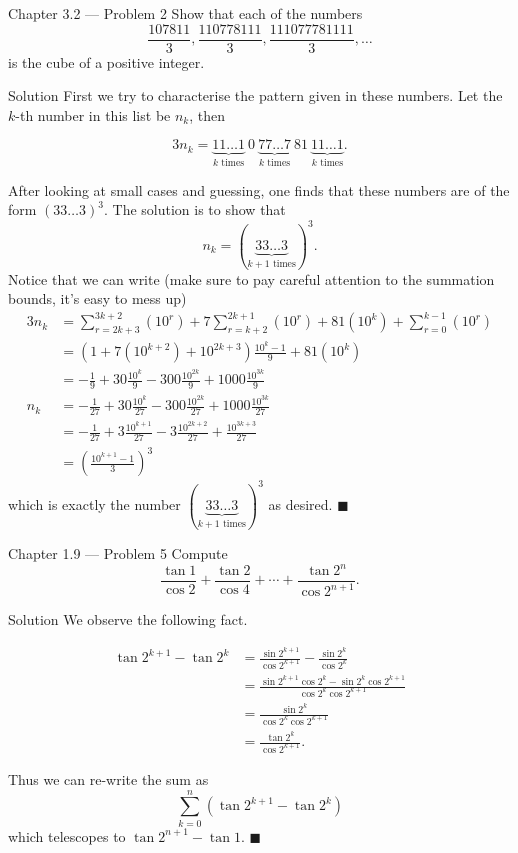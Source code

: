 \documentclass{article}
\begin{document}
\begin{problem}{Chapter 3.2 --- Problem 2}
Show that each of the numbers
$$
\frac{107811}{3}, \frac{110778111}{3}, \frac{111077781111}{3}, \ldots
$$
is the cube of a positive integer.
\end{problem}

\begin{solution}{Solution}
First we try to characterise the pattern given in these numbers. Let the
$k$-th number in this list be $n_k$, then

$$
3n_k = \underbrace{11\ldots1}_{k \text{ times}}\ 0 \
       \underbrace{77\ldots7}_{k \text{ times}}\ 81 \
       \underbrace{11\ldots1}_{k \text{ times}}.
$$

After looking at small cases and guessing, one finds that these numbers
are of the form $(33\ldots3)^3$. The solution is to show that
$$
n_k = (\underbrace{33\ldots3}_{k+1 \text{ times}})^3.
$$
Notice that we can write (make sure to pay careful attention
to the summation bounds, it's easy to mess up)
\[
\begin{aligned}
3n_k &= \sum_{r = 2k+3}^{3k+2} (10^r) + 7\sum_{r = k+2}^{2k+1} (10^r) +
81(10^{k}) + \sum_{r = 0}^{k-1} (10^r)\\
&= \left( 1 + 7(10^{k+2}) + 10^{2k+3} \right) \frac{10^k - 1}{9} + 81(10^k)
\\
&= -\frac19 + 30\frac{10^k}{9} - 300\frac{10^{2k}}{9} + 1000\frac{10^{3k}}{9}\\
n_k &= -\frac{1}{27} + 30\frac{10^k}{27} - 300\frac{10^{2k}}{27} +
1000\frac{10^{3k}}{27}\\
&= -\frac{1}{27} + 3\frac{10^{k+1}}{27} - 3\frac{10^{2k+2}}{27} +
\frac{10^{3k+3}}{27} \\
&= \left(\frac{10^{k+1} - 1}{3}\right)^3
\end{aligned}
\]
which is exactly the number $(\underbrace{33\ldots3}_{k+1 \text{ times}})^3$
as desired. $\blacksquare$
\end{solution}
\newpage

\begin{problem}{Chapter 1.9 --- Problem 5}
Compute
$$
\frac{\tan 1}{\cos 2} + \frac{\tan 2}{\cos 4} + \cdots +
\frac{\tan 2^n}{\cos 2^{n+1}}.
$$
\end{problem}

\begin{solution}{Solution}
We observe the following fact.

\[
\begin{aligned}
\tan 2^{k+1} - \tan 2^k &=
\frac{\sin 2^{k+1}}{\cos 2^{k+1}} - \frac{\sin 2^k}{\cos 2^k} \\
&=
\frac{\sin 2^{k+1} \cos 2^k - \sin 2^k \cos 2^{k+1}}{\cos 2^k \cos 2^{k+1}} \\
&= \frac{\sin 2^k}{\cos 2^k \cos 2^{k+1}}\\
&= \frac{\tan 2^k}{\cos 2^{k+1}}.
\end{aligned}
\]

Thus we can re-write the sum as
$$
\sum_{k=0}^n (\tan 2^{k+1} - \tan 2^k)
$$
which telescopes to $\tan 2^{n+1} - \tan 1$. $\blacksquare$
\end{solution}
\newpage
\end{document}
